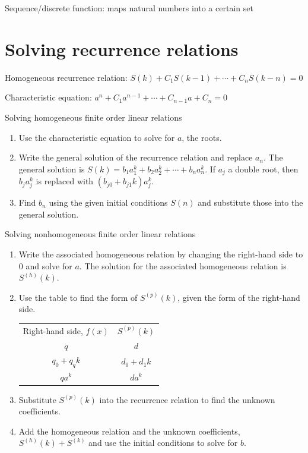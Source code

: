 \documentclass{article}
\begin{document}
Sequence/discrete function: maps natural numbers into a certain set

\section{Solving recurrence relations}

Homogeneous recurrence relation: $S(k) + C_1 S(k-1) + \cdots + C_n S(k-n) = 0$

Characteristic equation: $a^n + C_1 a^{n-1} + \cdots + C_{n-1} a + C_n = 0$

Solving homogeneous finite order linear relations
\begin{enumerate}
    \item Use the characteristic equation to solve for $a$, the roots.
    \item Write the general solution of the recurrence relation and replace $a_n$. The general solution is $S(k) = b_1 a_1^k + b_2 a_2^k + \cdots + b_n a_n^k$. If $a_j$ a double root, then $b_j a_j^k$ is replaced with $(b_{j0}+b_{j1} k)a_j^k$.
    \item Find $b_n$ using the given initial conditions $S(n)$ and substitute those into the general solution.
\end{enumerate}

Solving nonhomogeneous finite order linear relations
\begin{enumerate}
    \item Write the associated homogeneous relation by changing the right-hand side to $0$ and solve for $a$. The solution for the associated homogeneous relation is $S^{(h)}(k)$.
    \item Use the table to find the form of $S^{(p)}(k)$, given the form of the right-hand side. \\
    \begin{tabular}{c|c}
            Right-hand side, $f(x)$ & $S^{(p)}(k)$ \\
            $q$ & $d$ \\
            $q_0 + q_q k$ & $d_0 + d_1 k$ \\
            $qa^k$ & $da^k$
        \end{tabular}
    \item Substitute $S^{(p)}(k)$ into the recurrence relation to find the unknown coefficients.
    \item Add the homogeneous relation and the unknown coefficients, \\
    $S^{(h)}(k) + S^{(k)}$ and use the initial conditions to solve for $b$.
\end{enumerate}
\end{document}
